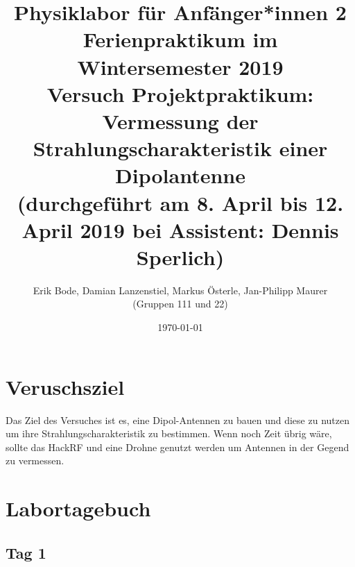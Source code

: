 \documentclass[titlepage,11pt,a4paper,ngerman]{article}
\begin{document}
\title{
	\large Physiklabor für Anfänger*innen 2 \\
	Ferienpraktikum im Wintersemester 2019 \\[4mm]
	\textbf{\LARGE 
		Versuch Projektpraktikum:\\[3mm]
		Vermessung der Strahlungscharakteristik einer Dipolantenne
			} \\[3mm]
	(durchgeführt am 8. April bis 12. April 2019 bei Assistent: Dennis Sperlich) \\}
\author{Erik Bode, Damian Lanzenstiel, Markus Österle, Jan-Philipp Maurer \\ (Gruppen 111 und 22)}
\date{\today}
\maketitle
\tableofcontents


\section{Veruschsziel}

Das Ziel des Versuches ist es, eine Dipol-Antennen zu bauen und diese zu nutzen um ihre Strahlungscharakteristik zu bestimmen. Wenn noch Zeit übrig wäre, sollte das HackRF und eine Drohne genutzt werden um Antennen in der Gegend zu vermessen.

\section{Labortagebuch}

\subsection{Tag 1}
\end{document}
